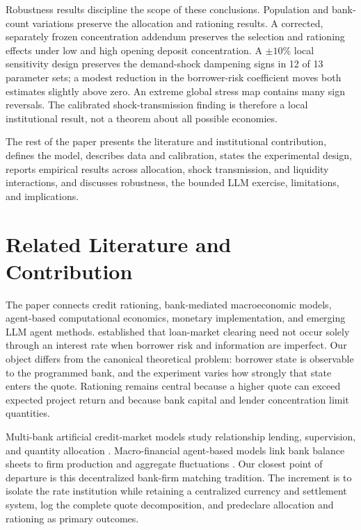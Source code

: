 \documentclass[11pt,a4paper]{article}
\begin{document}
Robustness results discipline the scope of these conclusions. Population and bank-count variations preserve the allocation and rationing results. A corrected, separately frozen concentration addendum preserves the selection and rationing effects under low and high opening deposit concentration. A $\pm 10\%$ local sensitivity design preserves the demand-shock dampening signs in 12 of 13 parameter sets; a modest reduction in the borrower-risk coefficient moves both estimates slightly above zero. An extreme global stress map contains many sign reversals. The calibrated shock-transmission finding is therefore a local institutional result, not a theorem about all possible economies.

The rest of the paper presents the literature and institutional contribution, defines the model, describes data and calibration, states the experimental design, reports empirical results across allocation, shock transmission, and liquidity interactions, and discusses robustness, the bounded LLM exercise, limitations, and implications.

\section{Related Literature and Contribution}

The paper connects credit rationing, bank-mediated macroeconomic models, agent-based computational economics, monetary implementation, and emerging LLM agent methods. \citet{stiglitz1981credit} established that loan-market clearing need not occur solely through an interest rate when borrower risk and information are imperfect. Our object differs from the canonical theoretical problem: borrower state is observable to the programmed bank, and the experiment varies how strongly that state enters the quote. Rationing remains central because a higher quote can exceed expected project return and because bank capital and lender concentration limit quantities.

Multi-bank artificial credit-market models study relationship lending, supervision, and quantity allocation \citep{zhang2018credit, neuner2025agent}. Macro-financial agent-based models link bank balance sheets to firm production and aggregate fluctuations \citep{ashraf2017banks, caiani2016agent, popoyan2017taming}. Our closest point of departure is this decentralized bank-firm matching tradition. The increment is to isolate the rate institution while retaining a centralized currency and settlement system, log the complete quote decomposition, and predeclare allocation and rationing as primary outcomes.
\end{document}
